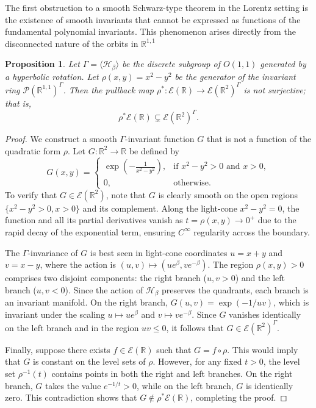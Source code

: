 \documentclass[]{article}
\newtheorem{proposition}[theorem]{Proposition}
\begin{document}
The first obstruction to a smooth Schwarz-type theorem in the Lorentz setting is the existence of smooth invariants that cannot be expressed as functions of the fundamental polynomial invariants. This phenomenon arises directly from the disconnected nature of the orbits in $\mathbb{R}^{1,1}$

\begin{proposition} \label{prop:insufficiency}
	Let $\Gamma = \langle \mathcal{H}_\beta \rangle$ be the discrete subgroup of $O(1,1)$ generated by a hyperbolic rotation. Let $\rho(x,y) = x^2 - y^2$ be the generator of the invariant ring $\mathcal{P}(\mathbb{R}^{1,1})^\Gamma$. Then the pullback map $\rho^* : \mathcal{E}(\mathbb{R}) \to \mathcal{E}(\mathbb{R}^2)^\Gamma$ is not surjective; that is,
	\[
	\rho^*\mathcal{E}(\mathbb{R}) \subsetneq \mathcal{E}(\mathbb{R}^2)^\Gamma.
	\]
\end{proposition}

\begin{proof}
	We construct a smooth $\Gamma$-invariant function $G$ that is not a function of the quadratic form $\rho$. Let $G: \mathbb{R}^2 \to \mathbb{R}$ be defined by
	\[
	G(x,y) =
	\begin{cases}
		\exp\left(-\frac{1}{x^2 - y^2}\right), & \text{if } x^2 - y^2 > 0 \text{ and } x > 0, \\0, & \text{otherwise}.\end{cases}
	\]
	To verify that $G \in \mathcal{E}(\mathbb{R}^2)$, note that $G$ is clearly smooth on the open regions $\{x^2 - y^2 > 0, x > 0\}$ and its complement. Along the light-cone $x^2 - y^2 = 0$, the function and all its partial derivatives vanish as $t = \rho(x,y) \to 0^+$ due to the rapid decay of the exponential term, ensuring $C^\infty$ regularity across the boundary.
	
	The $\Gamma$-invariance of $G$ is best seen in light-cone coordinates $u = x+y$ and $v = x-y$, where the action is $(u,v) \mapsto (ue^\beta, ve^{-\beta})$. The region $\rho(x,y) > 0$ comprises two disjoint components: the right branch ($u, v > 0$) and the left branch ($u, v < 0$). Since the action of $\mathcal{H}_\beta$ preserves the quadrants, each branch is an invariant manifold. On the right branch, $G(u,v) = \exp(-1/uv)$, which is invariant under the scaling $u \mapsto ue^\beta$ and $v \mapsto ve^{-\beta}$. Since $G$ vanishes identically on the left branch and in the region $uv \le 0$, it follows that $G \in \mathcal{E}(\mathbb{R}^2)^\Gamma$.
	
	Finally, suppose there exists $f \in \mathcal{E}(\mathbb{R})$ such that $G = f \circ \rho$. This would imply that $G$ is constant on the level sets of $\rho$. However, for any fixed $t > 0$, the level set $\rho^{-1}(t)$ contains points in both the right and left branches. On the right branch, $G$ takes the value $e^{-1/t} > 0$, while on the left branch, $G$ is identically zero. This contradiction shows that $G \notin \rho^*\mathcal{E}(\mathbb{R})$, completing the proof.
\end{proof}
\end{document}
